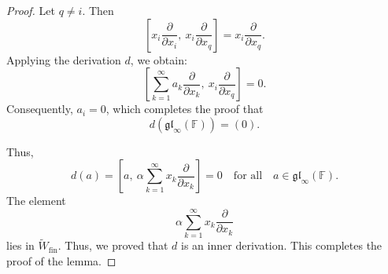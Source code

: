 \documentclass[10pt,a4paper]{amsart}
\begin{document}
\begin{proof}
		Let \( q \ne i \). Then
		\[
		\left[ x_i \frac{\partial}{\partial x_i}, \ x_i \frac{\partial}{\partial x_q} \right] = x_i \frac{\partial}{\partial x_q}.
		\] Applying the derivation \( d \), we obtain:
		\[
		\left[ \sum_{k=1}^\infty a_k \frac{\partial}{\partial x_k}, \ x_i \frac{\partial}{\partial x_q} \right] = 0.
		\] Consequently, \( a_i = 0 \), which completes the proof that
		\[
		d(\mathfrak{gl}_\infty(\mathbb{F})) = (0).
		\]
		
		Thus, \[
		d(a) = \left[a, \ \alpha  \sum_{k=1}^\infty  x_k  \frac{\partial}{\partial x_k}\right] = 0 \quad \text{for all} \quad a \in \mathfrak{gl}_\infty(\mathbb{F}).
		\] The element $$\alpha  \sum_{k=1}^\infty x_k  \frac{\partial}{\partial x_k}$$ lies in $\widetilde{W}_{\text{fin}}.$ Thus, we proved that $d$ is an inner derivation. This completes the proof of the lemma. 
	\end{proof}
\end{document}
